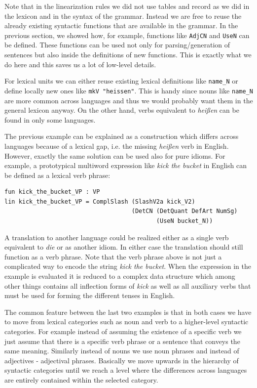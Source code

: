 \documentclass[output=paper]{LSP/langsci}
\begin{document}
Note that in the linearization rules we did not use tables and record as
we did in the lexicon and in the syntax of the grammar. 
Instead we are free to reuse the already existing syntactic functions 
that are available in the grammar. In the previous section, 
we showed how, for example, functions like \verb=AdjCN= and \verb=UseN= can be defined. These functions can be used not only for parsing/generation of sentences but also inside the definitions of new functions. This is exactly what we do here and this saves us a lot of low-level details.

For lexical units we can either reuse existing lexical definitions 
like \verb=name_N= or define locally new ones like \verb=mkV "heissen"=.
This is handy since nouns like \verb=name_N= are more common across 
languages and thus we would probably want them in 
the general lexicon anyway. On the other hand, verbs equivalent to 
\textit{hei{\ss}en} can be found in only some languages.

The previous example can be explained as a construction which differs
across languages because of a lexical gap, i.e. the missing \textit{hei{\ss}en}
verb in English. However, exactly the same solution can be used also for
pure idioms. For example, a prototypical multiword expression like
\textit{kick the bucket} in English can be defined as a lexical verb phrase:
\begin{verbatim}
fun kick_the_bucket_VP : VP
lin kick_the_bucket_VP = ComplSlash (SlashV2a kick_V2) 
                                    (DetCN (DetQuant DefArt NumSg)
                                           (UseN bucket_N))
\end{verbatim}
A translation to another language could be realized either as a single
verb equivalent to \textit{die} or as another idiom. In either case
the translation should still function as a verb phrase. Note that the
verb phrase above is not just a complicated way to encode the string 
\textit{kick the bucket}. When the expression in the example is evaluated
it is reduced to a complex data structure which among other things contains
all inflection forms of \textit{kick} as well as all auxiliary verbs that
must be used for forming the different tenses in English.

The common feature between the last two examples is that in both
cases we have to move from lexical categories such as noun and verb
to a higher-level syntactic categories. For example instead of assuming
the existence of a specific verb we just assume that there is a specific
verb phrase or a sentence that conveys the same meaning. Similarly
instead of nouns we use noun phrases and instead of adjectives - adjectival phrases.
Basically we move upwards in the hierarchy of syntactic categories until
we reach a level where the differences across languages are entirely
contained within the selected category. 
\end{document}

